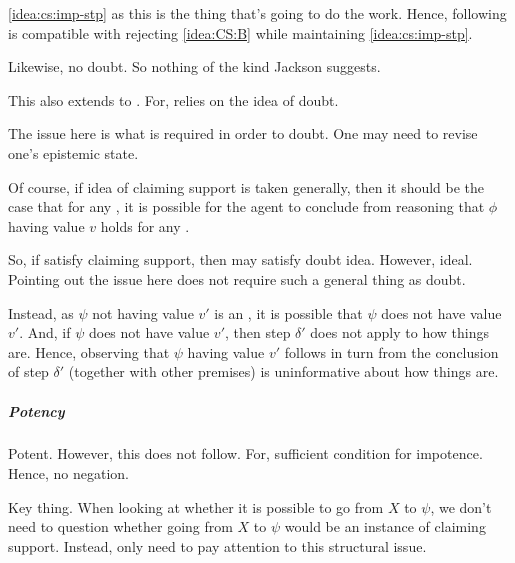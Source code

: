 \begin{note}
  \autoref{idea:cs:imp-stp} as this is the thing that's going to do the work.
  Hence, following is compatible with rejecting \autoref{idea:CS:B} while maintaining \autoref{idea:cs:imp-stp}.

  Likewise, no doubt.
  So nothing of the kind Jackson suggests.

  This also extends to \citeauthor{Wright:2011wn}.
  For, \citeauthor{Wright:2011wn} relies on the idea of doubt.

  The issue here is what is required in order to doubt.
  One may need to revise one's epistemic state.

  Of course, if idea of claiming support is taken generally, then it should be the case that for any \epP{} \world{}, it is possible for the agent to conclude from reasoning that \(\phi\) having value \(v\) holds for any \epVAd{} \world{}.

  So, if satisfy claiming support, then may satisfy doubt idea.
  However, ideal.
  Pointing out the issue here does not require such a general thing as doubt.
\end{note}

\begin{note}
  Instead, as \(\psi\) not having value \(v'\) is an \ep{}, it is possible that \(\psi\) does not have value \(v'\).
  And, if \(\psi\) does not have value \(v'\), then step \(\delta'\) does not apply to how things are.
  Hence, observing that \(\psi\) having value \(v'\) follows in turn from the conclusion of step \(\delta'\) (together with other premises) is uninformative about how things are.
\end{note}

\subparagraph{Potency}

\begin{note}
  Potent.
  However, this does not follow.
  For, sufficient condition for impotence.
  Hence, no negation.
\end{note}

\begin{note}
  Key thing.
  When looking at whether it is possible to go from \(X\) to \(\psi\), we don't need to question whether going from \(X\) to \(\psi\) would be an instance of claiming support.
  Instead, only need to pay attention to this structural issue.
\end{note}

